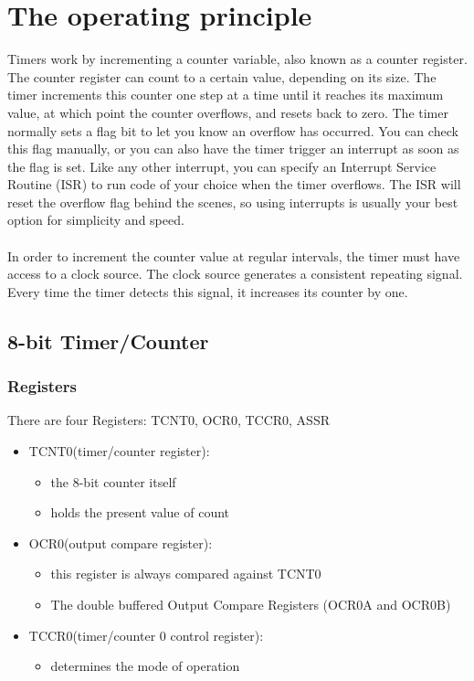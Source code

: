 \documentclass[english]{article}
\begin{document}
\section{The operating principle}
Timers work by incrementing a counter variable, also known as a counter register. The counter register can count to a certain value, depending on its size. The timer increments this counter one step at a time until it reaches its maximum value, at which point the counter overflows, and resets back to zero. The timer normally sets a flag bit to let you know an overflow has occurred. You can check this flag manually, or you can also have the timer trigger an interrupt as soon as the flag is set. Like any other interrupt, you can specify an Interrupt Service Routine (ISR) to run code of your choice when the timer overflows. The ISR will reset the overflow flag behind the scenes, so using interrupts is usually your best option for simplicity and speed.\\\\
In order to increment the counter value at regular intervals, the timer must have access to a clock source.  The clock source generates a consistent repeating signal.  Every time the timer detects this signal, it increases its counter by one.
\subsection{8-bit Timer/Counter}
\subsubsection{Registers}
There are four Registers: TCNT0, OCR0, TCCR0, ASSR
\begin{itemize}
\item TCNT0(timer/counter register):
	\begin{itemize}
	\item the 8-bit counter itself
	\item holds the present value of count
	\end{itemize}

\item OCR0(output compare register):
	\begin{itemize}
	\item this register is always compared against TCNT0
	\item The double buffered Output Compare Registers (OCR0A and OCR0B)
	\end{itemize}
\item TCCR0(timer/counter 0 control register):
	\begin{itemize}
	\item determines the mode of operation
	\end{itemize}

\end{itemize}
\end{document}
